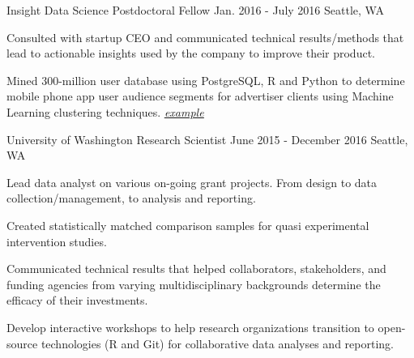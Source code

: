 \begin{cventries}
  \cventry
  {Insight Data Science}
  {Postdoctoral Fellow}
  {Jan. 2016 - July 2016}
  {Seattle, WA}
  {
    \begin{cvitems}
      \item {Consulted with startup CEO and communicated technical results/methods that lead to actionable insights used by the company to improve their product.}
      \item {Mined 300-million user database using PostgreSQL, R and Python to determine mobile phone app user audience segments for advertiser clients using Machine Learning clustering techniques. \href{https://youtu.be/QwjuLMO930E}{\underline{\textit{example}}}}
    \end{cvitems}
  }
 \cventry
 {University of Washington}
 {Research Scientist}
 {June 2015 - December 2016}
 {Seattle, WA}
 {
   \begin{cvitems}
     \item{Lead data analyst on various on-going grant projects.  From design to data collection/management, to analysis and reporting.}
     \item{Created statistically matched comparison samples for quasi experimental intervention studies.}
     \item{Communicated technical results that helped collaborators, stakeholders, and funding agencies from varying multidisciplinary backgrounds determine the efficacy of their investments.}
     \item{Develop interactive workshops to help research organizations transition to open-source technologies (R and Git) for collaborative data analyses and reporting.}
   \end{cvitems}
 }


\end{cventries}
